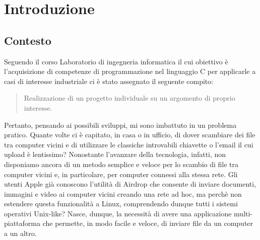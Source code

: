 \documentclass[11pt,fleqn]{book} %
\begin{document}

\pagestyle{empty} %

\tableofcontents %


\pagestyle{fancy} %



\chapter{Introduzione}

\section{Contesto}

Seguendo il corso Laboratorio di ingegneria informatica il cui obiettivo è l'acquisizione di competenze di programmazione nel linguaggio C per applicarle a casi di interesse industriale ci è stato assegnato il seguente compito:

\begin{quote}
Realizzazione di un progetto individuale su un argomento di proprio interesse.
\end{quote}

\noindent Pertanto, pensando ai possibili sviluppi, mi sono imbattuto in un problema pratico.
Quante volte ci è capitato, in casa o in ufficio, di dover scambiare dei file tra computer vicini e di utilizzare le classiche introvabili chiavette o l'email il cui upload è lentissimo?
Nonostante l'avanzare della tecnologia, infatti, non disponiamo ancora di un metodo semplice e veloce per lo scambio di file tra computer vicini e, in particolare, per computer connessi alla stessa rete.
Gli utenti Apple già conoscono l'utilità di Airdrop che consente di inviare documenti, immagini e video ai computer vicini creando una rete ad hoc, ma perchè non estendere questa funzionalità a Linux, comprendendo dunque tutti i sistemi operativi Unix-like?
Nasce, dunque, la necessità di avere una applicazione multi-piattaforma che permette, in modo facile e veloce, di inviare file da un computer a un altro.
\end{document}
